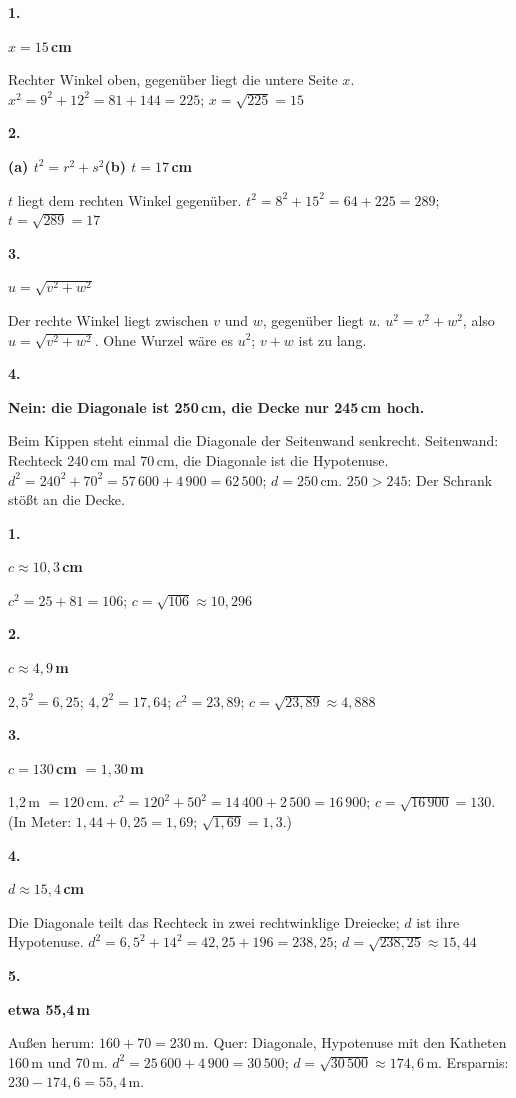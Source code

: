 \documentclass[11pt]{article}
\newcommand{\lsg}[3]{\par\noindent\begin{minipage}[t]{9mm}\textbf{#1}\end{minipage}%
  \begin{minipage}[t]{52mm}\raggedright\bfseries\boldmath #2\end{minipage}\hspace{3mm}%
  \begin{minipage}[t]{\dimexpr\linewidth-64mm\relax}\raggedright\small #3\end{minipage}\par\vspace{4pt}}
\begin{document}
\par\smallskip
{}\par
\par\Needspace{25mm}\vspace{6pt}\noindent\colorbox{black!12}{}\hspace{2mm}{\bfseries Hypotenuse finden und berechnen}\par\vspace{4pt}
\lsg{1.}{$x = 15$\,cm}{Rechter Winkel oben, gegenüber liegt die untere Seite $x$. $x^2 = 9^2 + 12^2 = 81 + 144 = 225$; $x = \sqrt{225} = 15$}
\lsg{2.}{(a) $t^2 = r^2 + s^2$\quad (b) $t = 17$\,cm}{$t$ liegt dem rechten Winkel gegenüber. $t^2 = 8^2 + 15^2 = 64 + 225 = 289$; $t = \sqrt{289} = 17$}
\lsg{3.}{$u = \sqrt{v^2 + w^2}$}{Der rechte Winkel liegt zwischen $v$ und $w$, gegenüber liegt $u$. $u^2 = v^2 + w^2$, also $u = \sqrt{v^2 + w^2}$. Ohne Wurzel wäre es $u^2$; $v + w$ ist zu lang.}
\lsg{4.}{Nein: die Diagonale ist 250\,cm, die Decke nur 245\,cm hoch.}{Beim Kippen steht einmal die Diagonale der Seitenwand senkrecht. Seitenwand: Rechteck 240\,cm mal 70\,cm, die Diagonale ist die Hypotenuse. $d^2 = 240^2 + 70^2 = 57\,600 + 4\,900 = 62\,500$; $d = 250$\,cm. $250 > 245$: Der Schrank stößt an die Decke.}
\par\Needspace{25mm}\vspace{6pt}\noindent\colorbox{black!12}{}\hspace{2mm}{\bfseries Wenn die Wurzel nicht aufgeht}\par\vspace{4pt}
\lsg{1.}{$c \approx 10{,}3$\,cm}{$c^2 = 25 + 81 = 106$; $c = \sqrt{106} \approx 10{,}296$}
\lsg{2.}{$c \approx 4{,}9$\,m}{$2{,}5^2 = 6{,}25$; $4{,}2^2 = 17{,}64$; $c^2 = 23{,}89$; $c = \sqrt{23{,}89} \approx 4{,}888$}
\lsg{3.}{$c = 130$\,cm $= 1{,}30$\,m}{1,2\,m $= 120$\,cm. $c^2 = 120^2 + 50^2 = 14\,400 + 2\,500 = 16\,900$; $c = \sqrt{16\,900} = 130$. (In Meter: $1{,}44 + 0{,}25 = 1{,}69$; $\sqrt{1{,}69} = 1{,}3$.)}
\lsg{4.}{$d \approx 15{,}4$\,cm}{Die Diagonale teilt das Rechteck in zwei rechtwinklige Dreiecke; $d$ ist ihre Hypotenuse. $d^2 = 6{,}5^2 + 14^2 = 42{,}25 + 196 = 238{,}25$; $d = \sqrt{238{,}25} \approx 15{,}44$}
\lsg{5.}{etwa 55,4\,m}{Außen herum: $160 + 70 = 230$\,m. Quer: Diagonale, Hypotenuse mit den Katheten 160\,m und 70\,m. $d^2 = 25\,600 + 4\,900 = 30\,500$; $d = \sqrt{30\,500} \approx 174{,}6$\,m. Ersparnis: $230 - 174{,}6 = 55{,}4$\,m.}
\end{document}
